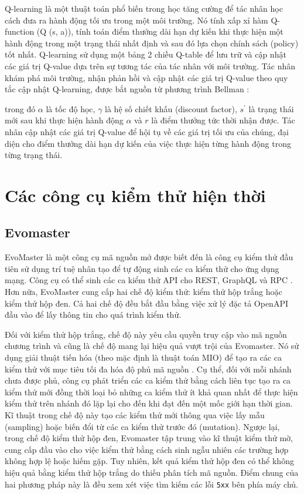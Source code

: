Q-learning là một thuật toán phổ biến trong học tăng cường để tác nhân học cách đưa ra hành động tối ưu trong một môi trường. Nó tính xấp xỉ hàm Q-function (Q (s, a)), tính toán điểm thưởng dài hạn dự kiến khi thực hiện một hành động trong một trạng thái nhất định và sau đó lựa chọn chính sách (policy) tốt nhất. Q-learning sử dụng một bảng 2 chiều Q-table để lưu trữ và cập nhật các giá trị Q-value dựa trên sự tương tác của tác nhân với môi trường. Tác nhân khám phá môi trường, nhận phản hồi và cập nhật các giá trị Q-value theo quy tắc cập nhật Q-learning, được bắt nguồn từ phương trình Bellman \cite{RL}:


trong đó $\alpha$ là tốc độ học, $\gamma$ là hệ số chiết khấu (discount factor), $s^{'}$ là trạng thái mới sau khi thực hiện hành động $\alpha$ và $r$ là điểm thưởng tức thời nhận được. Tác nhân cập nhật các giá trị Q-value để hội tụ về các giá trị tối ưu của chúng, đại diện cho điểm thưởng dài hạn dự kiến của việc thực hiện từng hành động trong từng trạng thái.

\section{Các công cụ kiểm thử hiện thời}

\subsection{Evomaster}
EvoMaster là một công cụ mã nguồn mở được biết đến là công cụ kiểm thử  đầu tiên sử dụng trí tuệ nhân tạo để tự động sinh các ca kiểm thử cho ứng dụng mạng. Công cụ có thể sinh các ca kiểm thử API cho REST, GraphQL và RPC \cite{graphql,xmlrpc}. Hơn nữa, EvoMaster cung cấp hai chế độ kiểm thử: kiểm thử hộp trắng  hoặc kiểm thử hộp đen. Cả hai chế độ đều bắt đầu bằng việc xử lý đặc tả OpenAPI đầu vào để lấy thông tin cho quá trình kiểm thử.

Đối với kiểm thử hộp trắng, chế độ này yêu cầu quyền truy cập vào mã nguồn chương trình và cũng là chế độ mang lại hiệu quả vượt trội của Evomaster. Nó sử dụng giải thuật tiến hóa (theo mặc định là thuật toán MIO) để tạo ra các ca kiểm thử với mục tiêu tối đa hóa độ phủ mã nguồn \cite{Arcuri_2017}.  Cụ thể, đối với mỗi nhánh chưa được phủ, công cụ phát triển các ca kiểm thử  bằng cách liên tục tạo ra ca kiểm thử mới đồng thời loại bỏ những ca kiểm thử ít khả quan nhất  để thực hiện kiểm thử trên nhánh đó lặp lại cho đến khi đạt đến một mốc giới hạn thời gian. Kĩ thuật trong chế độ này tạo các kiểm thử mới thông qua việc lấy mẫu (sampling) hoặc biến đổi từ các ca kiểm thử trước đó (mutation). Ngược lại, trong chế độ kiểm thử hộp đen, Evomaster tập trung vào kĩ thuật kiểm thử mờ, cung cấp đầu vào cho việc kiểm thử bằng cách sinh ngẫu nhiên các trường hợp không hợp lệ hoặc hiếm gặp. Tuy nhiên, kết quả kiểm thử hộp đen có thể không hiệu quả bằng kiểm thử hộp trắng do thiếu phân tích mã nguồn. Điểm chung của hai phương pháp này là đều xem xét việc tìm kiếm các lỗi \texttt{5xx} bên phía máy chủ.
